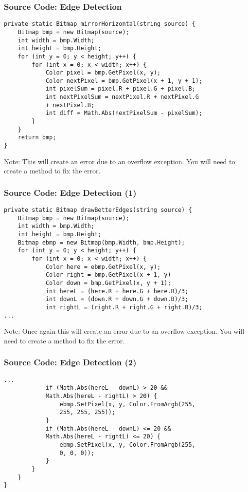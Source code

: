 \begin{frame}[fragile]
	\frametitle{Source Code: Edge Detection}
	
\begin{lstlisting}
private static Bitmap mirrorHorizontal(string source) {  
	Bitmap bmp = new Bitmap(source);
	int width = bmp.Width;
	int height = bmp.Height;  
	for (int y = 0; y < height; y++) {
		for (int x = 0; x < width; x++) {
			Color pixel = bmp.GetPixel(x, y);
			Color nextPixel = bmp.GetPixel(x + 1, y + 1);
			int pixelSum = pixel.R + pixel.G + pixel.B;
			int nextPixelSum = nextPixel.R + nextPixel.G
			+ nextPixel.B;
			int diff = Math.Abs(nextPixelSum - pixelSum);
		}
	}
	return bmp;
}
\end{lstlisting}

\small Note: This will create an error due to an overflow exception. You will need to create a method to fix the error.

\end{frame}


\begin{frame}[fragile]
	\frametitle{Source Code: Edge Detection (1)}
	
\begin{lstlisting}
private static Bitmap drawBetterEdges(string source) {  
	Bitmap bmp = new Bitmap(source);
	int width = bmp.Width;
	int height = bmp.Height;
	Bitmap ebmp = new Bitmap(bmp.Width, bmp.Height);
	for (int y = 0; y < height; y++) {
		for (int x = 0; x < width; x++)	{
			Color here = ebmp.GetPixel(x, y);
			Color right = bmp.GetPixel(x + 1, y)
			Color down = bmp.GetPixel(x, y + 1);
			int hereL = (here.R + here.G + here.B)/3;
			int downL = (down.R + down.G + down.B)/3;
			int rightL = (right.R + right.G + right.B)/3;
...
\end{lstlisting}

Note: Once again this will create an error due to an overflow exception. You will need to create a method to fix the error.

\end{frame}

\begin{frame}[fragile]
	\frametitle{Source Code: Edge Detection (2)}
	
\begin{lstlisting}
...
			if (Math.Abs(hereL - downL) > 20 && 
			Math.Abs(hereL - rightL) > 20) {
				ebmp.SetPixel(x, y, Color.FromArgb(255, 
				255, 255, 255));
			}
			if (Math.Abs(hereL - downL) <= 20 && 
			Math.Abs(hereL - rightL) <= 20) {
				ebmp.SetPixel(x, y, Color.FromArgb(255, 
				0, 0, 0));
			}	
		}	
	}
}

\end{lstlisting}

\end{frame}

